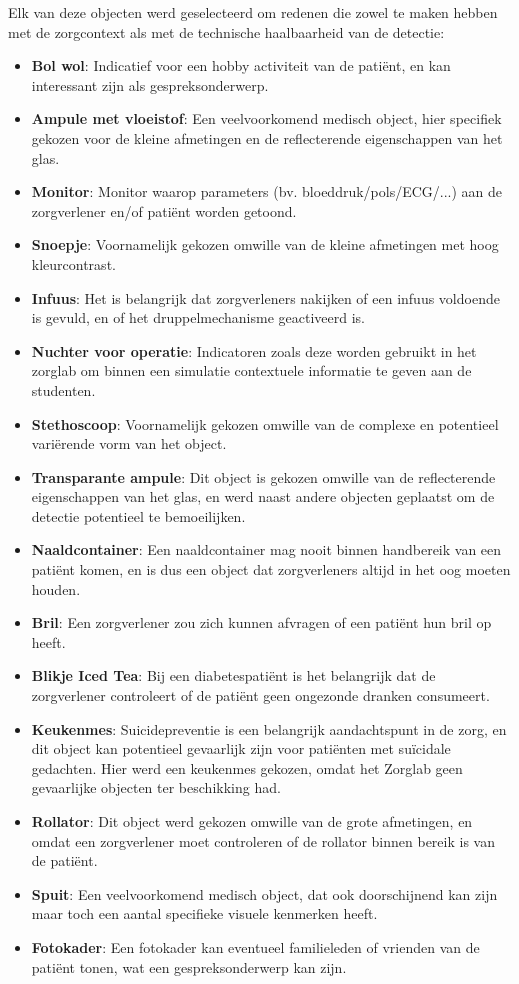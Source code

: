 Elk van deze objecten werd geselecteerd om redenen die zowel te maken hebben met de zorgcontext als met de technische haalbaarheid van de detectie:
\begin{itemize}
  \item \textbf{Bol wol}: Indicatief voor een hobby activiteit van de patiënt, en kan interessant zijn als gespreksonderwerp.
  \item \textbf{Ampule met vloeistof}: Een veelvoorkomend medisch object, hier specifiek gekozen voor de kleine afmetingen en de reflecterende eigenschappen van het glas.
  \item \textbf{Monitor}: Monitor waarop parameters (bv. bloeddruk/pols/ECG/...) aan de zorgverlener en/of patiënt worden getoond.
  \item \textbf{Snoepje}: Voornamelijk gekozen omwille van de kleine afmetingen met hoog kleurcontrast.
  \item \textbf{Infuus}: Het is belangrijk dat zorgverleners nakijken of een infuus voldoende is gevuld, en of het druppelmechanisme geactiveerd is.
  \item \textbf{Nuchter voor operatie}: Indicatoren zoals deze worden gebruikt in het zorglab om binnen een simulatie contextuele informatie te geven aan de studenten.
  \item \textbf{Stethoscoop}: Voornamelijk gekozen omwille van de complexe en potentieel variërende vorm van het object.
  \item \textbf{Transparante ampule}: Dit object is gekozen omwille van de reflecterende eigenschappen van het glas, en werd naast andere objecten geplaatst om de detectie potentieel te bemoeilijken.
  \item \textbf{Naaldcontainer}: Een naaldcontainer mag nooit binnen handbereik van een patiënt komen, en is dus een object dat zorgverleners altijd in het oog moeten houden.
  \item \textbf{Bril}: Een zorgverlener zou zich kunnen afvragen of een patiënt hun bril op heeft.
  \item \textbf{Blikje Iced Tea}: Bij een diabetespatiënt is het belangrijk dat de zorgverlener controleert of de patiënt geen ongezonde dranken consumeert.
  \item \textbf{Keukenmes}: Suicidepreventie is een belangrijk aandachtspunt in de zorg, en dit object kan potentieel gevaarlijk zijn voor patiënten met suïcidale gedachten. Hier werd een keukenmes gekozen, omdat het Zorglab geen gevaarlijke objecten ter beschikking had.
  \item \textbf{Rollator}: Dit object werd gekozen omwille van de grote afmetingen, en omdat een zorgverlener moet controleren of de rollator binnen bereik is van de patiënt.
  \item \textbf{Spuit}: Een veelvoorkomend medisch object, dat ook doorschijnend kan zijn maar toch een aantal specifieke visuele kenmerken heeft.
  \item \textbf{Fotokader}: Een fotokader kan eventueel familieleden of vrienden van de patiënt tonen, wat een gespreksonderwerp kan zijn.
\end{itemize}

